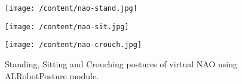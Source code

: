 \begin{figure}
	\centering 
	\begin{minipage}
		{.3 
		\textwidth} \centering 
		\texttt{[image: /content/nao-stand.jpg]} 
	\end{minipage}
	\begin{minipage}
		{.3 
		\textwidth} \centering 
		\texttt{[image: /content/nao-sit.jpg]} 
	\end{minipage}
	\begin{minipage}
		{.3 
		\textwidth} \centering 
		\texttt{[image: /content/nao-crouch.jpg]} 
	\end{minipage}
	\caption{Standing, Sitting and Crouching postures of virtual NAO using ALRobotPosture module. \cite{8}} \label{fg:nao:motion} 
\end{figure}
